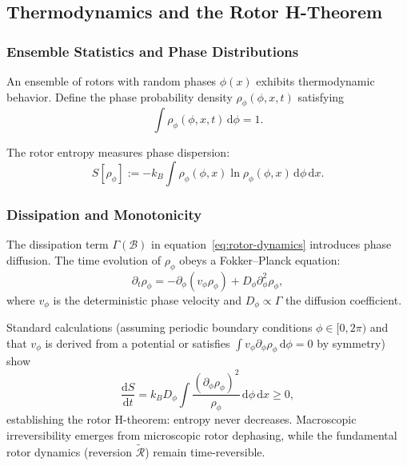 \documentclass[11pt,a4paper]{article}
\newcommand{\rev}[1]{\widetilde{#1}}           %
\newcommand{\Rotor}{\mathcal{R}}
\newcommand{\Biv}{\mathcal{B}}
\theoremstyle{definition}
\theoremstyle{plain}
\theoremstyle{remark}
\begin{document}
\subsection{Thermodynamics and the Rotor H-Theorem}

\subsubsection{Ensemble Statistics and Phase Distributions}

An ensemble of rotors with random phases $\phi(x)$ exhibits thermodynamic behavior. Define the phase probability density $\rho_\phi(\phi,x,t)$ satisfying
\begin{equation}
\int \rho_\phi(\phi,x,t)\, \mathrm{d}\phi = 1.
\end{equation}

The rotor entropy measures phase dispersion:
\begin{equation}
S[\rho_\phi] := -k_B \int \rho_\phi(\phi,x) \ln \rho_\phi(\phi,x)\, \mathrm{d}\phi\, \mathrm{d}x.
\end{equation}

\subsubsection{Dissipation and Monotonicity}

The dissipation term $\Gamma(\Biv)$ in equation~\eqref{eq:rotor-dynamics} introduces phase diffusion. The time evolution of $\rho_\phi$ obeys a Fokker--Planck equation:
\begin{equation}
\partial_t \rho_\phi = -\partial_\phi\!\left(v_\phi \rho_\phi\right) + D_\phi \partial_\phi^2 \rho_\phi,
\end{equation}
where $v_\phi$ is the deterministic phase velocity and $D_\phi \propto \Gamma$ the diffusion coefficient.

Standard calculations (assuming periodic boundary conditions $\phi \in [0, 2\pi)$ and that $v_\phi$ is derived from a potential or satisfies $\int v_\phi \partial_\phi \rho_\phi\, \mathrm{d}\phi = 0$ by symmetry) show
\begin{equation}
\frac{\mathrm{d}S}{\mathrm{d}t} = k_B D_\phi \int \frac{(\partial_\phi \rho_\phi)^2}{\rho_\phi}\, \mathrm{d}\phi\, \mathrm{d}x \geq 0,
\end{equation}
establishing the rotor H-theorem: entropy never decreases. Macroscopic irreversibility emerges from microscopic rotor dephasing, while the fundamental rotor dynamics (reversion $\rev{\Rotor}$) remain time-reversible.
\end{document}
